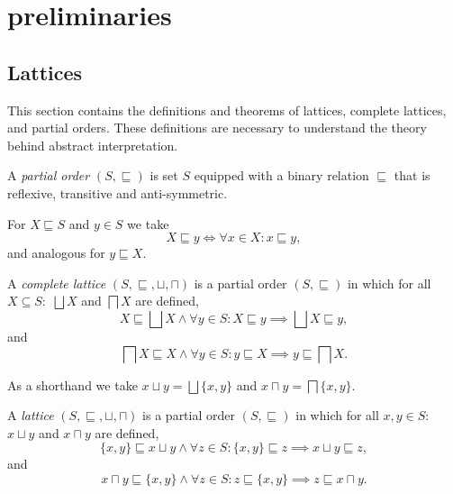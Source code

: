 
\section{preliminaries}\label{sec:preliminaries}

\subsection{Lattices}\label{sec:lattices}
This section contains the definitions and theorems of lattices, complete lattices, and partial orders.
These definitions are necessary to understand the theory behind abstract interpretation. \cite{nielson_formal_2019}

\begin{definition}
    A \textit{partial order} $(S, \sqsubseteq)$ is set $S$ equipped with a binary relation $\sqsubseteq$ that is reflexive, transitive and anti-symmetric.
\end{definition}

For $X \sqsubseteq S$ and $y \in S$ we take
\begin{equation*}
    X \sqsubseteq y \iff \forall x \in X : x \sqsubseteq y,
\end{equation*}
and analogous for $y \sqsubseteq X$.

\begin{definition}
    A \textit{complete lattice} $(S, \sqsubseteq, \sqcup, \sqcap)$ is a partial order $(S, \sqsubseteq)$ in which for all $X \subseteq S:$ $\bigsqcup X$ and $\bigsqcap X$ are defined,
        \begin{equation*}
            X \sqsubseteq \bigsqcup X \land \forall y \in S : X \sqsubseteq y \implies \bigsqcup X \sqsubseteq y,
        \end{equation*}
        and
        \begin{equation*}
            \bigsqcap X \sqsubseteq X \land \forall y \in S : y \sqsubseteq X \implies y \sqsubseteq \bigsqcap X.
        \end{equation*}
\end{definition}

As a shorthand we take $x \sqcup y = \bigsqcup \{x, y\}$ and $x \sqcap y = \bigsqcap \{x, y\}$.

\begin{definition}
    A \textit{lattice} $(S, \sqsubseteq, \sqcup, \sqcap)$ is a partial order $(S, \sqsubseteq)$ in which for all $x,y \in S:$ $x \sqcup y$ and $x \sqcap y$ are defined,
        \begin{equation*}
            \{x, y\} \sqsubseteq x \sqcup y \land \forall z \in S : \{x, y\} \sqsubseteq z \implies x \sqcup y \sqsubseteq z,
        \end{equation*}
        and
        \begin{equation*}
            x \sqcap y \sqsubseteq \{x, y\} \land \forall z \in S : z \sqsubseteq \{x, y\} \implies z \sqsubseteq x \sqcap y.
        \end{equation*}
\end{definition}

